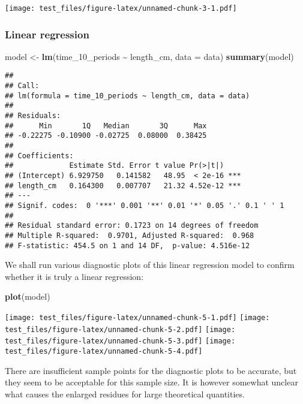 \documentclass[
]{article}
\newenvironment{Shaded}{\begin{snugshade}}{\end{snugshade}}
\newcommand{\AttributeTok}[1]{\textcolor[rgb]{0.13,0.29,0.53}{#1}}
\newcommand{\FunctionTok}[1]{\textcolor[rgb]{0.13,0.29,0.53}{\textbf{#1}}}
\newcommand{\NormalTok}[1]{#1}
\newcommand{\OtherTok}[1]{\textcolor[rgb]{0.56,0.35,0.01}{#1}}
\newcommand{\SpecialCharTok}[1]{\textcolor[rgb]{0.81,0.36,0.00}{\textbf{#1}}}
\begin{document}
\texttt{[image: test\_files/figure-latex/unnamed-chunk-3-1.pdf]}

\subsubsection{Linear regression}\label{linear-regression}

\begin{Shaded}
\begin{Highlighting}[]
\NormalTok{model }\OtherTok{\textless{}{-}} \FunctionTok{lm}\NormalTok{(time\_10\_periods }\SpecialCharTok{\textasciitilde{}}\NormalTok{ length\_cm, }\AttributeTok{data =}\NormalTok{ data)}
\FunctionTok{summary}\NormalTok{(model)}
\end{Highlighting}
\end{Shaded}

\begin{verbatim}
## 
## Call:
## lm(formula = time_10_periods ~ length_cm, data = data)
## 
## Residuals:
##      Min       1Q   Median       3Q      Max 
## -0.22275 -0.10900 -0.02725  0.08000  0.38425 
## 
## Coefficients:
##             Estimate Std. Error t value Pr(>|t|)    
## (Intercept) 6.929750   0.141582   48.95  < 2e-16 ***
## length_cm   0.164300   0.007707   21.32 4.52e-12 ***
## ---
## Signif. codes:  0 '***' 0.001 '**' 0.01 '*' 0.05 '.' 0.1 ' ' 1
## 
## Residual standard error: 0.1723 on 14 degrees of freedom
## Multiple R-squared:  0.9701, Adjusted R-squared:  0.968 
## F-statistic: 454.5 on 1 and 14 DF,  p-value: 4.516e-12
\end{verbatim}

We shall run various diagnostic plots of this linear regression model to
confirm whether it is truly a linear regression:

\begin{Shaded}
\begin{Highlighting}[]
\FunctionTok{plot}\NormalTok{(model)}
\end{Highlighting}
\end{Shaded}

\texttt{[image: test\_files/figure-latex/unnamed-chunk-5-1.pdf]}
\texttt{[image: test\_files/figure-latex/unnamed-chunk-5-2.pdf]}
\texttt{[image: test\_files/figure-latex/unnamed-chunk-5-3.pdf]}
\texttt{[image: test\_files/figure-latex/unnamed-chunk-5-4.pdf]}

There are insufficient sample points for the diagnostic plots to be
accurate, but they seem to be acceptable for this sample size. It is
however somewhat unclear what causes the enlarged residues for large
theoretical quantities.
\end{document}

